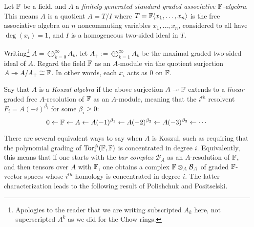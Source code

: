 \begin{defn} \rm
Let $\mathbb{F}$ be a field, and $A$ a {\it finitely generated standard graded associative $\mathbb{F}$-algebra}.  This means $A$ is a quotient $A=T/I$ where $T=\mathbb{F}\langle x_1,\ldots,x_n\rangle$ is the free associative algebra on $n$ noncommuting variables $x_1,\ldots,x_n$, considered to all have
$\deg(x_i)=1$, and $I$ is a homogeneous two-sided ideal in $T$.

Writing\footnote{Apologies to the reader that we are writing subscripted $A_k$ here, not superscripted $A^k$ as we did for the Chow rings.} $A=\bigoplus_{k=0}^\infty A_k$, let 
$A_+:=\bigoplus_{k=1}^\infty A_k$ be the maximal graded two-sided ideal of $A$.  Regard the field $\mathbb{F}$ as an $A$-module via the quotient surjection $A \twoheadrightarrow A/A_+ \cong \mathbb{F}$.  In other words,
each $x_i$ acts as $0$ on $\mathbb{F}$.  

Say that $A$ is a {\it Koszul algebra} if the above
surjection $A \twoheadrightarrow \mathbb{F}$ extends to a {\it linear} graded free $A$-resolution of $\mathbb{F}$ as an $A$-module, meaning that the $i^{th}$ resolvent $F_i = A(-i)^{\beta_i}$ for some $\beta_i \geq 0$:
$$
0 \leftarrow \mathbb{F} 
\leftarrow A
\leftarrow A(-1)^{\beta_1} 
\leftarrow A(-2)^{\beta_2} 
\leftarrow A(-3)^{\beta_3} 
\leftarrow \cdots
$$
\end{defn}
There are several equivalent ways to say when $A$ is Koszul, such
as requiring that the polynomial grading of $\mathrm{Tor}^A_i(\mathbb{F},\mathbb{F})$ is concentrated in degree $i$.  Equivalently, this means that if one starts with the {\it bar complex} $\mathcal{B}_A$ as an $A$-resolution of $\mathbb{F}$, and then tensors over $A$ with $\mathbb{F}$, one obtains a complex $\mathbb{F} \otimes_A \mathcal{B}_A$ of graded $\mathbb{F}$-vector spaces whose $i^{th}$ homology is concentrated in degree $i$.  The latter characterization leads
to the following result of Polishchuk and Positselski.

